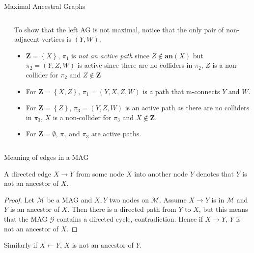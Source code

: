 \documentclass[english, compress, red]{beamer}
\begin{document}
\begin{frame}{Maximal Ancestral Graphs}
	\begin{columns}
		\begin{column}{0.3\textwidth}
			\centering
		\end{column}
	     \begin{column}{0.7\textwidth}
	     	To show that the left AG is not maximal, notice that the only pair of non-adjacent vertices is $(Y,W)$.
	     	\begin{itemize}
	     		\item $\mathbf{Z} = \left\{ X\right\}$, $\pi_1$ is \textit{not an active path} since $Z \not \in \textbf{an}(X)$ but $\pi_2 = (Y,Z,W)$ is active since there are no colliders in $\pi_2$, $Z$ is a non-collider for $\pi_2$ and $Z \not \in \mathbf{Z}$
	     		\item For $\mathbf{Z} = \left\{ X, Z\right\}$, $\pi_1 = (Y,X,Z,W)$ is a path that m-connects $Y$ and $W$.
	     		\item For $\mathbf{Z} = \left\{ Z\right\}$, $\pi_3 = (Y,Z,W)$ is an active path as there are no colliders in $\pi_3$, $X$ is a non-collider for $\pi_3$ and $X \not \in \mathbf{Z}$.
	     		\item For $\mathbf{Z} = \emptyset$, $\pi_1$ and $\pi_3$ are active paths.
	     	\end{itemize}
	     \end{column}
	\end{columns}
\end{frame}

\begin{frame}{Meaning of edges in a MAG}
	\begin{theorem}
		A directed edge $X \rightarrow Y$ from some node $X$ into another node $Y$ denotes that $Y$ is not an ancestor of $X$.
	\end{theorem}
	\begin{proof}
		Let $\mathcal{M}$ be a MAG and $X,Y$ two nodes on $\mathcal{M}$. Assume $X \rightarrow Y$ is in $\mathcal{M}$ and $Y$ is an ancestor of $X$. Then there is a directed path from $Y$ to $X$, but this means that the MAG $\mathcal{G}$ contains a directed cycle, contradiction. Hence if $X \rightarrow Y$, $Y$ is not an ancestor of $X$.
	\end{proof}
	Similarly if $X \leftarrow Y$, $X$ is not an ancestor of $Y$.
	
\end{frame}
\end{document}
